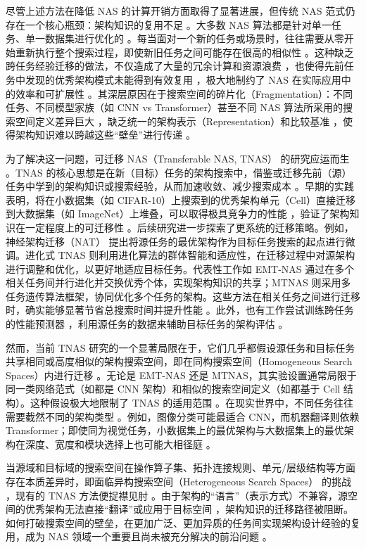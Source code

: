 \documentclass[../main.tex]{subfiles}
\begin{document}
尽管上述方法在降低 NAS 的计算开销方面取得了显著进展，但传统 NAS 范式仍存在一个核心瓶颈：架构知识的复用不足 。大多数 NAS 算法都是针对单一任务、单一数据集进行优化的 。每当面对一个新的任务或场景时，往往需要从零开始重新执行整个搜索过程，即使新旧任务之间可能存在很高的相似性 。这种缺乏跨任务经验迁移的做法，不仅造成了大量的冗余计算和资源浪费 ，也使得先前任务中发现的优秀架构模式未能得到有效复用 ，极大地制约了 NAS 在实际应用中的效率和可扩展性 。其深层原因在于搜索空间的碎片化（Fragmentation）：不同任务、不同模型家族（如 CNN vs Transformer）甚至不同 NAS 算法所采用的搜索空间定义差异巨大 ，缺乏统一的架构表示（Representation）和比较基准 ，使得架构知识难以跨越这些“壁垒”进行传递 。

为了解决这一问题，可迁移 NAS（Transferable NAS, TNAS） 的研究应运而生 。TNAS 的核心思想是在新（目标）任务的架构搜索中，借鉴或迁移先前（源）任务中学到的架构知识或搜索经验，从而加速收敛、减少搜索成本 。早期的实践 表明，将在小数据集（如 CIFAR-10）上搜索到的优秀架构单元（Cell）直接迁移到大数据集（如 ImageNet）上堆叠，可以取得极具竞争力的性能 ，验证了架构知识在一定程度上的可迁移性 。后续研究进一步探索了更系统的迁移策略。例如，神经架构迁移（NAT） 提出将源任务的最优架构作为目标任务搜索的起点进行微调。进化式 TNAS 则利用进化算法的群体智能和适应性，在迁移过程中对源架构进行调整和优化，以更好地适应目标任务。代表性工作如 EMT-NAS 通过在多个相关任务间并行进化并交换优秀个体，实现架构知识的共享；MTNAS 则采用多任务遗传算法框架，协同优化多个任务的架构。这些方法在相关任务之间进行迁移时，确实能够显著节省总搜索时间并提升性能 。此外，也有工作尝试训练跨任务的性能预测器 ，利用源任务的数据来辅助目标任务的架构评估 。

然而，当前 TNAS 研究的一个显著局限在于，它们几乎都假设源任务和目标任务共享相同或高度相似的架构搜索空间，即在同构搜索空间（Homogeneous Search Spaces）内进行迁移 。无论是 EMT-NAS 还是 MTNAS，其实验设置通常局限于同一类网络范式（如都是 CNN 架构）和相似的搜索空间定义（如都基于 Cell 结构）。这种假设极大地限制了 TNAS 的适用范围 。在现实世界中，不同任务往往需要截然不同的架构类型 。例如，图像分类可能最适合 CNN，而机器翻译则依赖 Transformer；即使同为视觉任务，小数据集上的最优架构与大数据集上的最优架构在深度、宽度和模块选择上也可能大相径庭 。

当源域和目标域的搜索空间在操作算子集、拓扑连接规则、单元/层级结构等方面存在本质差异时，即面临异构搜索空间（Heterogeneous Search Spaces） 的挑战 ，现有的 TNAS 方法便捉襟见肘 。由于架构的“语言”（表示方式）不兼容，源空间的优秀架构无法直接“翻译”或应用于目标空间 ，架构知识的迁移路径被阻断。如何打破搜索空间的壁垒，在更加广泛、更加异质的任务间实现架构设计经验的复用，成为 NAS 领域一个重要且尚未被充分解决的前沿问题 。
\end{document}
